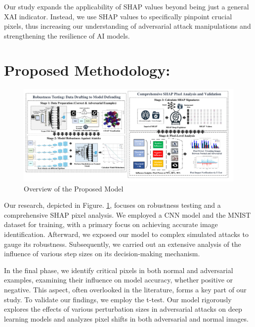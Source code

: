 \documentclass[10pt, conference, a4paper, final]{IEEEtran}
\begin{document}


Our study expands the applicability of SHAP values beyond being just a general XAI indicator. Instead, we use SHAP values to specifically pinpoint crucial pixels, thus increasing our understanding of adversarial attack manipulations and strengthening the resilience of AI models.


\section{Proposed Methodology:}

\begin{figure}[!ht]
    \centering
    \includegraphics[width=\linewidth]{Model/EuroML_V2.pdf}
    \caption{Overview of the Proposed Model}
    \label{overview}
\end{figure}
   
Our research, depicted in Figure. \ref{overview}, focuses on robustness testing and a comprehensive SHAP pixel analysis. We employed a CNN model and the MNIST dataset for training, with a primary focus on achieving accurate image identification. Afterward, we exposed our model to complex simulated attacks to gauge its robustness. Subsequently, we carried out an extensive analysis of the influence of various step sizes on its decision-making mechanism.

In the final phase, we identify critical pixels in both normal and adversarial examples, examining their influence on model accuracy, whether positive or negative. This aspect, often overlooked in the literature, forms a key part of our study. To validate our findings, we employ the t-test. Our model rigorously explores the effects of various perturbation sizes in adversarial attacks on deep learning models and analyzes pixel shifts in both adversarial and normal images.
\end{document}
